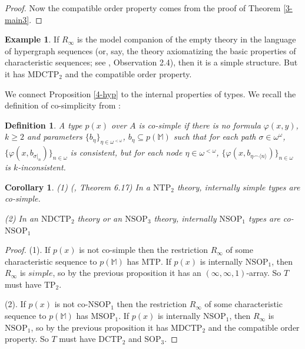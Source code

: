 \documentclass[12pt]{amsart}
\newtheorem{corollary}{Corollary}[theorem]
\newtheorem{definition}{Definition}[section]
\theoremstyle{definition}
\newtheorem{example}[theorem]{Example}
\begin{document}
\begin{proof}
Now the compatible order property comes from the proof of Theorem \ref{3-main3}.




    
\end{proof}

\begin{example}
    If $R_{\infty}$ is the model companion of the empty theory in the language of hypergraph sequences (or, say, the theory axiomatizing the basic properties of characteristic sequences; see \cite{Mal10}, Observation 2.4), then it is a simple structure. But it has $\mathrm{MDCTP}_{2}$ and the compatible order property.
\end{example} 

We connect Proposition \ref{4-hyp} to the internal properties of types. We recall the definition of co-simplicity from \cite{Che14}:

\begin{definition}
    A type $p(x)$ over $A$ is co-simple if there is no formula $\varphi(x, y)$, $k \geq 2$ and parameters $\{b_{\eta}\}_{\eta \in \omega^{< \omega}}$, $b_{\eta} \subseteq p(\mathbb{M})$ such that for each path $\sigma \in \omega^{\omega}$, $\{\varphi(x, b_{\sigma|_{n} })\}_{n \in \omega}$ is consistent, but for each node $\eta \in \omega^{< \omega}$, $\{\varphi(x, b_{\eta \smallfrown \langle n \rangle })\}_{n \in \omega}$ is $k$-inconsistent.
\end{definition}


\begin{corollary}
(1) (\cite{Che14}, Theorem 6.17) In a $\mathrm{NTP}_{2}$ theory, internally simple types are co-simple. 

(2) In an $\mathrm{NDCTP}_{2}$ theory or an $\mathrm{NSOP}_{3}$ theory, internally $\mathrm{NSOP}_{1}$ types are co-$\mathrm{NSOP}_{1}$
\end{corollary}

\begin{proof}
    
    (1). If $p(x)$ is not co-simple then the restriction $R_{\infty}$ of some characteristic sequence to $p(\mathbb{M})$ has $\mathrm{MTP}$. If $p(x)$ is internally $\mathrm{NSOP}_{1}$, then $R_{\infty}$ is $simple$, so by the previous proposition it has an $(\infty, \infty, 1)$-array. So $T$ must have $\mathrm{TP}_{2}$.

    (2). If $p(x)$ is not co-$\mathrm{NSOP}_{1}$ then the restriction $R_{\infty}$ of some characteristic sequence to $p(\mathbb{M})$ has $\mathrm{MSOP}_{1}$. If $p(x)$ is internally $\mathrm{NSOP}_{1}$, then $R_{\infty}$ is $\mathrm{NSOP}_{1}$, so by the previous proposition it has $\mathrm{MDCTP}_{2}$ and the compatible order property. So $T$ must have $\mathrm{DCTP}_{2}$ and $\mathrm{SOP}_{3}$.
\end{proof}
\end{document}
